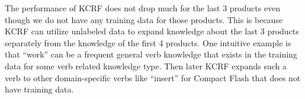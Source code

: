 The performance of KCRF does not drop much for the last 3 products even though we do not have any training data for those products. This is because KCRF can utilize unlabeled data to expand knowledge about the last 3 products separately from the knowledge of the first 4 products. One intuitive example is that ``work'' can be a frequent general verb knowledge that exists in the training data for some verb related knowledge type. Then later KCRF expands such a verb to other domain-specific verbs like ``insert'' for Compact Flash that does not have training data.  


